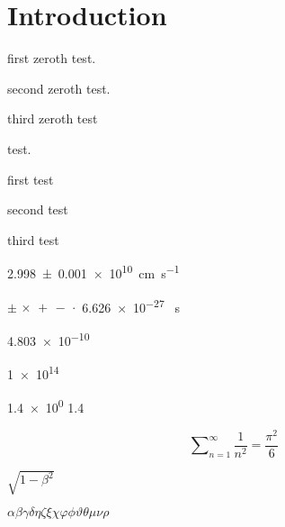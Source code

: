 \chapter{Introduction}
\label{ch:introduction}


first zeroth test. \autocite{Carpio_2020, Alvarez_2004, Jackson_1999}

second zeroth test. \autocite{Carpio_2020, Alvarez_2004}

third zeroth test \autocite{Carpio_2020, Jackson_1999}

test. \autocite{Li_2012}

first test \cite{Carpio_2020, Alvarez_2004, Jackson_1999}

second test \cite{Carpio_2020, Alvarez_2004}

third test \cite{Carpio_2020, Jackson_1999}

\cite{Thompson_1993}

\cite{Li_2012}

\cite{Haskell_2018}

\qty{2.998+-0.001e10}{\centi\meter\per\second}

$\pm\,\times\,+\,-\,\cdot$ \num{6.626e-27}
\unit{\erg\second}

\qty{4.803e-10}{\esu}

\qty{1e14}{\gauss}

\num{1.4e0} \num{1.4}

\begin{equation}
\sum\nolimits_{n=1}^\infty \frac{1}{n^2}=\frac{\pi^2}{6}
\end{equation}

$\sqrt{1 - \beta^2}$

$\alpha \beta \gamma \delta \eta \zeta \xi \chi \varphi \phi \vartheta \theta \mu \nu \rho$
